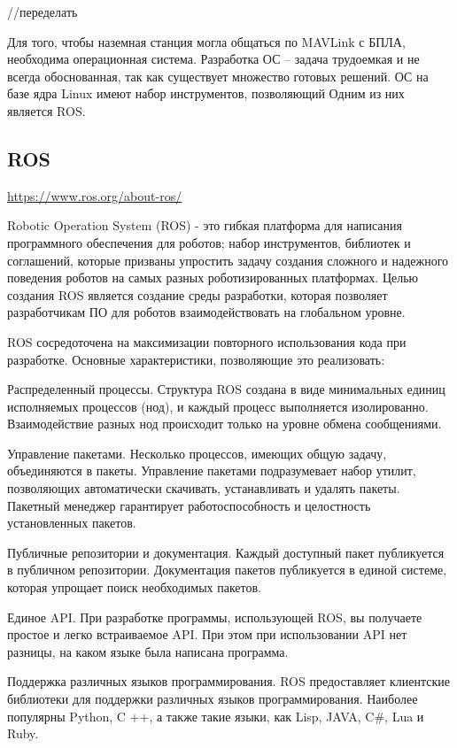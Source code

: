 //переделать

Для того, чтобы наземная станция могла общаться по MAVLink с БПЛА, необходима операционная система. Разработка ОС -- задача трудоемкая и не всегда обоснованная, так как существует множество готовых решений. ОС на базе ядра Linux имеют набор инструментов, позволяющий  Одним из них является ROS.
\subsection{ROS}
\url{https://www.ros.org/about-ros/}

Robotic Operation System (ROS) - это гибкая платформа для написания программного обеспечения для роботов; набор инструментов, библиотек и соглашений, которые призваны упростить задачу создания сложного и надежного поведения роботов на самых разных роботизированных платформах.
\cite{ros}
Целью создания ROS является создание среды разработки, которая позволяет разработчикам ПО для роботов взаимодействовать на глобальном уровне.

ROS сосредоточена на максимизации повторного использования кода при разработке. Основные характеристики, позволяющие это реализовать:

Распределенный процессы. Структура ROS создана в виде минимальных единиц исполняемых процессов (нод), и каждый процесс выполняется изолированно. Взаимодействие разных нод происходит только на уровне обмена сообщениями.

Управление пакетами. Несколько процессов, имеющих общую задачу, объединяются в пакеты. Управление пакетами подразумевает набор утилит, позволяющих автоматически скачивать, устанавливать и удалять пакеты. Пакетный менеджер гарантирует работоспособность и целостность установленных пакетов.

Публичные репозитории и документация. Каждый доступный пакет публикуется в публичном репозитории. Документация пакетов публикуется в единой системе, которая упрощает поиск необходимых пакетов.

Единое API. При разработке программы, использующей ROS, вы получаете простое и легко встраиваемое API. При этом при использовании API нет разницы, на каком языке была написана программа.

Поддержка различных языков программирования. ROS предоставляет клиентские библиотеки для поддержки различных языков программирования. Наиболее популярны Python, C ++, а также такие языки, как Lisp, JAVA, C\#, Lua и Ruby.
\cite{voltbro}

